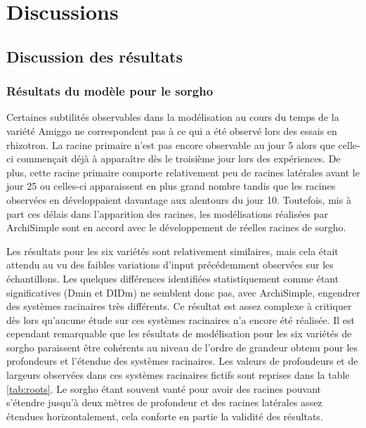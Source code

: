 \section{Discussions}

\subsection{Discussion des résultats}

\subsubsection{Résultats du modèle pour le sorgho}

Certaines subtilités observables dans la modélisation au cours du temps de la variété Amiggo ne correspondent pas à ce qui a été observé lors des essais en rhizotron.
La racine primaire n'est pas encore observable au jour 5 alors que celle-ci commençait déjà à apparaître dès le troisième jour lors des expériences.
De plus, cette racine primaire comporte relativement peu de racines latérales avant le jour 25 ou celles-ci apparaissent en plus grand nombre tandis que les racines observées en développaient davantage aux alentours du jour 10.
Toutefois, mis à part ces délais dans l'apparition des racines, les modélisations réalisées par ArchiSimple sont en accord avec le développement de réelles racines de sorgho.
\newline

Les résultats pour les six variétés sont relativement similaires, mais cela était attendu au vu des faibles variations d'input précédemment observées sur les échantillons.
Les quelques différences identifiées statistiquement comme étant significatives (Dmin et DIDm) ne semblent donc pas, avec ArchiSimple, engendrer des systèmes racinaires très différents.
Ce résultat est assez complexe à critiquer dès lors qu'aucune étude sur ces systèmes racinaires n'a encore été réalisée.
Il est cependant remarquable que les résultats de modélisation pour les six variétés de sorgho paraissent être cohérents au niveau de l'ordre de grandeur obtenu pour les profondeurs et l'étendue des systèmes racinaires.
Les valeurs de profondeurs et de largeurs observées dans ces systèmes racinaires fictifs sont reprises dans la table \ref{tab:roots}.
Le sorgho étant souvent vanté pour avoir des racines pouvant s'étendre jusqu'à deux mètres de profondeur et des racines latérales assez étendues horizontalement, cela conforte en partie la validité des résultats.

